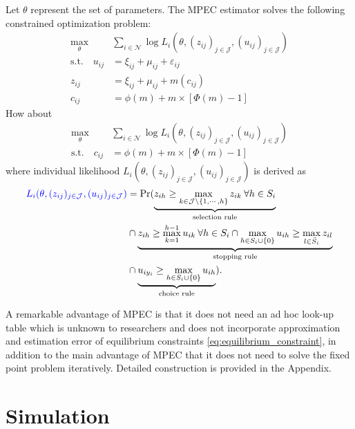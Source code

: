 \documentclass[12pt]{article}
\begin{document}
Let \(\theta\) represent the set of parameters. The MPEC estimator solves the following constrained optimization problem:
\color{blue}
\begin{align}
    \max_{\theta}& \sum_{i\in \mathcal{N}} \log L_{i}(\theta,(z_{ij})_{j\in \mathcal{J}},(u_{ij})_{j\in \mathcal{J}})\nonumber\\
    \text{s.t.}\quad u_{i j} & =\xi_{i j}+\mu_{i j}+\varepsilon_{i j} \label{eq:mpec_formula}\\
    z_{i j}&=\xi_{i j}+\mu_{i j}+m\left(c_{i j}\right) \nonumber\\
    c_{i j}&=\phi(m)+m \times[\Phi(m)-1] \nonumber
\end{align}
How about
\begin{align}
    \max_{\theta}& \sum_{i\in \mathcal{N}} \log L_{i}(\theta,(z_{ij})_{j\in \mathcal{J}},(u_{ij})_{j\in \mathcal{J}})\nonumber\\
    \text{s.t.}\quad  
    c_{i j}&=\phi(m)+m \times[\Phi(m)-1] \label{eq:mpec_formula}
\end{align}
\color{black}
where individual likelihood $L_{i}(\theta,(z_{ij})_{j\in \mathcal{J}},(u_{ij})_{j\in \mathcal{J}})$ is derived as
\begin{align}
    {\color{blue} L_{i}(\theta,(z_{ij})_{j\in \mathcal{J}},(u_{ij})_{j\in \mathcal{J}})} &= \Pr (\underbrace{z_{ih} \geq \max_{k \in \mathcal{J}\setminus \{1,\cdots,h\}} z_{ik} \: \forall h \in S_i}_{\text{selection rule}}\nonumber\\
    & \cap \underbrace{z_{ih} \geq \max_{k = 1}^{h-1} u_{ik} \: \forall h \in S_i \cap \max_{h \in S_i \cup \{0\}} u_{ih} \geq \max_{l \in \bar{S}_i} z_{il} }_{\text{stopping rule}}\nonumber\\
    & \cap \underbrace{u_{iy_i} \geq \max_{h \in S_i \cup \{0\}} u_{ih} }_{\text{choice rule}}). \label{eq:likelihood}
\end{align}

A remarkable advantage of MPEC is that it does not need an ad hoc look-up table which is unknown to researchers and does not incorporate approximation and estimation error of equilibrium constraints \eqref{eq:equilibrium_constraint}, in addition to the main advantage of MPEC that it does not need to solve the fixed point problem iteratively. Detailed construction is provided in the Appendix.

\section{Simulation}
\end{document}
